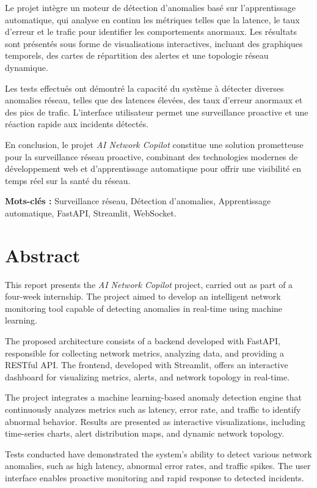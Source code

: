 \documentclass[12pt,a4paper]{report}
\begin{document}
Le projet intègre un moteur de détection d'anomalies basé sur l'apprentissage automatique, qui analyse en continu les métriques telles que la latence, le taux d'erreur et le trafic pour identifier les comportements anormaux. Les résultats sont présentés sous forme de visualisations interactives, incluant des graphiques temporels, des cartes de répartition des alertes et une topologie réseau dynamique.

Les tests effectués ont démontré la capacité du système à détecter diverses anomalies réseau, telles que des latences élevées, des taux d'erreur anormaux et des pics de trafic. L'interface utilisateur permet une surveillance proactive et une réaction rapide aux incidents détectés.

En conclusion, le projet \textit{AI Network Copilot} constitue une solution prometteuse pour la surveillance réseau proactive, combinant des technologies modernes de développement web et d'apprentissage automatique pour offrir une visibilité en temps réel sur la santé du réseau.

\textbf{Mots-clés :} Surveillance réseau, Détection d'anomalies, Apprentissage automatique, FastAPI, Streamlit, WebSocket.

\chapter*{Abstract}
\thispagestyle{empty}

This report presents the \textit{AI Network Copilot} project, carried out as part of a four-week internship. The project aimed to develop an intelligent network monitoring tool capable of detecting anomalies in real-time using machine learning.

The proposed architecture consists of a backend developed with FastAPI, responsible for collecting network metrics, analyzing data, and providing a RESTful API. The frontend, developed with Streamlit, offers an interactive dashboard for visualizing metrics, alerts, and network topology in real-time.

The project integrates a machine learning-based anomaly detection engine that continuously analyzes metrics such as latency, error rate, and traffic to identify abnormal behavior. Results are presented as interactive visualizations, including time-series charts, alert distribution maps, and dynamic network topology.

Tests conducted have demonstrated the system's ability to detect various network anomalies, such as high latency, abnormal error rates, and traffic spikes. The user interface enables proactive monitoring and rapid response to detected incidents.
\end{document}
